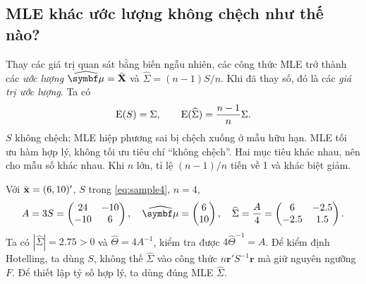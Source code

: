 
\subsection{MLE khác ước lượng không chệch như thế nào?}
Thay các giá trị quan sát bằng biến ngẫu nhiên, các công thức MLE trở
thành các \emph{ước lượng} $\widehat{\vmu}=\Xbar$ và
$\widehat\Sigma=(n-1)S/n$. Khi đã thay số, đó là các \emph{giá trị ước lượng}.
Ta có
\[
 \operatorname{E}(S)=\Sigma,\qquad
 \operatorname{E}(\widehat\Sigma)=\frac{n-1}{n}\Sigma.
\]
$S$ không chệch; MLE hiệp phương sai bị chệch xuống ở mẫu hữu hạn.
MLE tối ưu hàm hợp lý, không tối ưu tiêu chí ``không chệch''. Hai mục
tiêu khác nhau, nên cho mẫu số khác nhau. Khi $n$ lớn, tỉ lệ $(n-1)/n$
tiến về 1 và khác biệt giảm.

\begin{example}
Với $\bar{\mathbf x}=(6,10)'$, $S$ trong \eqref{eq:sample4}, $n=4$,
\[
 A=3S=\begin{pmatrix}24&-10\\-10&6\end{pmatrix},\quad
 \widehat{\vmu}=\begin{pmatrix}6\\10\end{pmatrix},\quad
 \widehat\Sigma=\frac A4=\begin{pmatrix}6&-2.5\\-2.5&1.5\end{pmatrix}.
\]
Ta có $|\widehat\Sigma|=2.75>0$ và $\widehat\Theta=4A^{-1}$,
kiểm tra được $4\widehat\Theta^{-1}=A$.
Để kiểm định Hotelling, ta dùng $S$, không thế $\widehat\Sigma$ vào
công thức $n\mathbf r'S^{-1}\mathbf r$ mà giữ nguyên ngưỡng $F$.
Để thiết lập tỷ số hợp lý, ta dùng đúng MLE $\widehat\Sigma$.
\end{example}


